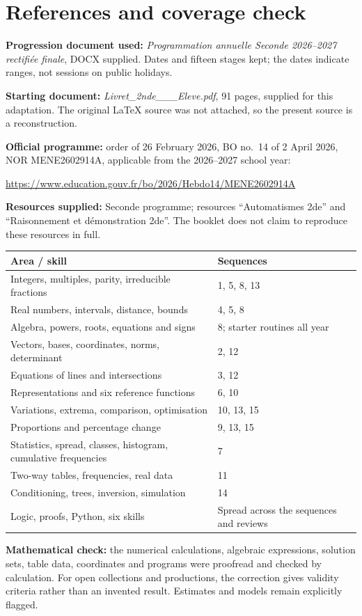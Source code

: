 \clearpage\section*{References and coverage check}
\textbf{Progression document used:} \emph{Programmation annuelle Seconde 2026--2027 rectifiée finale}, DOCX supplied. Dates and fifteen stages kept; the dates indicate ranges, not sessions on public holidays.
\par\textbf{Starting document:} \emph{Livret\_2nde\_\_\_Eleve.pdf}, 91 pages, supplied for this adaptation. The original LaTeX source was not attached, so the present source is a reconstruction.
\par\textbf{Official programme:} order of 26 February 2026, BO no.~14 of 2 April 2026, NOR MENE2602914A, applicable from the 2026--2027 school year:
\par\url{https://www.education.gouv.fr/bo/2026/Hebdo14/MENE2602914A}
\par\textbf{Resources supplied:} Seconde programme; resources ``Automatismes 2de'' and ``Raisonnement et démonstration 2de''. The booklet does not claim to reproduce these resources in full.
\begin{center}\small\renewcommand{\arraystretch}{1.5}\begin{tabularx}{\linewidth}{p{8cm} X}
\textbf{Area / skill}&\textbf{Sequences}\\\hline
Integers, multiples, parity, irreducible fractions&1, 5, 8, 13\\
Real numbers, intervals, distance, bounds&4, 5, 8\\
Algebra, powers, roots, equations and signs&8; starter routines all year\\
Vectors, bases, coordinates, norms, determinant&2, 12\\
Equations of lines and intersections&3, 12\\
Representations and six reference functions&6, 10\\
Variations, extrema, comparison, optimisation&10, 13, 15\\
Proportions and percentage change&9, 13, 15\\
Statistics, spread, classes, histogram, cumulative frequencies&7\\
Two-way tables, frequencies, real data&11\\
Conditioning, trees, inversion, simulation&14\\
Logic, proofs, Python, six skills&Spread across the sequences and reviews
\end{tabularx}\end{center}
\textbf{Mathematical check:} the numerical calculations, algebraic expressions, solution sets, table data, coordinates and programs were proofread and checked by calculation. For open collections and productions, the correction gives validity criteria rather than an invented result. Estimates and models remain explicitly flagged.
\fi
